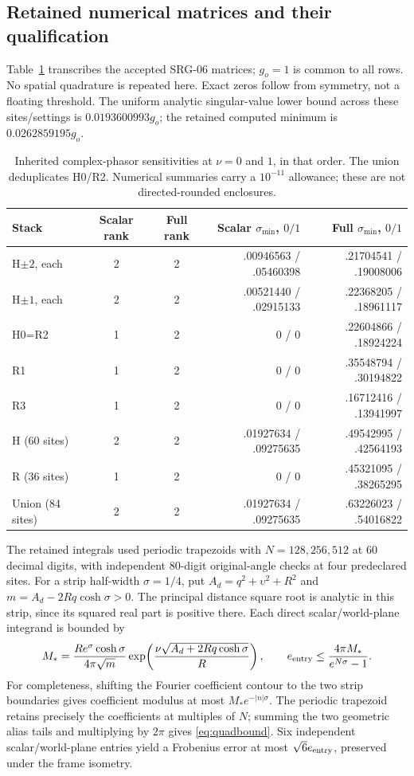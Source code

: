 \subsection{Retained numerical matrices and their qualification}\label{sec:numerics}
Table~\ref{tab:Qdata} transcribes the accepted SRG-06 matrices; $g_o=1$ is common to all rows. No spatial quadrature is repeated here. Exact zeros follow from symmetry, not a floating threshold. The uniform analytic singular-value lower bound across these sites/settings is $0.0193600993g_o$; the retained computed minimum is $0.0262859195g_o$.
\begin{table}[htbp]\centering\small
\begin{tabular}{lccrr}\toprule
Stack & Scalar rank & Full rank & Scalar $\sigma_{\min}$, $0/1$ & Full $\sigma_{\min}$, $0/1$\\\midrule
H$\pm2$, each &2&2& .00946563 / .05460398&.21704541 / .19008006\\
H$\pm1$, each &2&2& .00521440 / .02915133&.22368205 / .18961117\\
H0=R2 &1&2&0 / 0&.22604866 / .18924224\\
R1 &1&2&0 / 0&.35548794 / .30194822\\
R3 &1&2&0 / 0&.16712416 / .13941997\\
H (60 sites)&2&2&.01927634 / .09275635&.49542995 / .42564193\\
R (36 sites)&1&2&0 / 0&.45321095 / .38265295\\
Union (84 sites)&2&2&.01927634 / .09275635&.63226023 / .54016822\\\bottomrule
\end{tabular}
\caption{Inherited complex-phasor sensitivities at $\nu=0$ and $1$, in that order. The union deduplicates H0/R2. Numerical summaries carry a $10^{-11}$ allowance; these are not directed-rounded enclosures.}\label{tab:Qdata}
\end{table}

The retained integrals used periodic trapezoids with $N=128,256,512$ at 60 decimal digits, with independent 80-digit original-angle checks at four predeclared sites. For a strip half-width $\sigma=1/4$, put $A_d=q^2+\upsilon^2+R^2$ and $m=A_d-2Rq\cosh\sigma>0$. The principal distance square root is analytic in this strip, since its squared real part is positive there. Each direct scalar/world-plane integrand is bounded by
\begin{equation}\label{eq:quadbound}
 M_*=\frac{Re^\sigma\cosh\sigma}{4\pi\sqrt m}
 \exp\!\left(\frac{\nu\sqrt{A_d+2Rq\cosh\sigma}}R\right),
 \qquad e_{\rm entry}\le\frac{4\pi M_*}{e^{N\sigma}-1}.
\end{equation}
For completeness, shifting the Fourier coefficient contour to the two strip boundaries gives coefficient modulus at most $M_*e^{-|n|\sigma}$. The periodic trapezoid retains precisely the coefficients at multiples of $N$; summing the two geometric alias tails and multiplying by $2\pi$ gives \eqref{eq:quadbound}. Six independent scalar/world-plane entries yield a Frobenius error at most $\sqrt6e_{\rm entry}$, preserved under the frame isometry.

